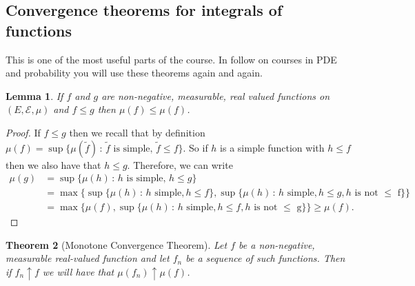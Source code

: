 \documentclass[11pt]{article}
\newtheorem{thm}{Theorem}[section]
\newtheorem{lem}[thm]{Lemma}
\theoremstyle{definition}
\theoremstyle{remark}
\begin{document}
\subsection{Convergence theorems for integrals of functions}
This is one of the most useful parts of the course. In follow on courses in PDE and probability you will use these theorems again and again.
\begin{lem}
If $f$ and $g$ are non-negative, measurable, real valued functions on $(E, \mathcal{E}, \mu)$ and $f \leq g$ then $\mu(f) \leq \mu(f)$.
\end{lem}
\begin{proof}
If $f \leq g$ then we recall that by definition $\mu(f) = \sup\{ \mu(\tilde{f}) \,:\, \mbox{$\tilde{f}$ is simple},\, \tilde{f} \leq f\}$. So if $h$ is a simple function with $h \leq f$ then we also have that $h \leq g$. Therefore, we can write
\begin{align*} \mu(g) &= \sup\{ \mu(h) \,:\, \mbox{$h$ is simple},\, h \leq g\} \\ &= \max\{\sup\{ \mu(h)\, :\, \mbox{$h$ simple}, h \leq f\}, \sup\{ \mu(h)\, :\, \mbox{$h$ simple}, h \leq g, \mbox{$h$ is not $\leq$ f}\} \}\\ &= \max\{ \mu(f), \sup\{ \mu(h)\, :\, \mbox{$h$ simple}, h \leq f, \mbox{$h$ is not $\leq$ g}\}\} \geq \mu(f).\end{align*}
\end{proof}
\begin{thm}[Monotone Convergence Theorem]
Let $f$ be a non-negative, measurable real-valued function and let $f_n$ be a sequence of such functions. Then if $f_n \uparrow f$ we will have that $\mu(f_n) \uparrow \mu(f)$.
\end{thm}
\end{document}
